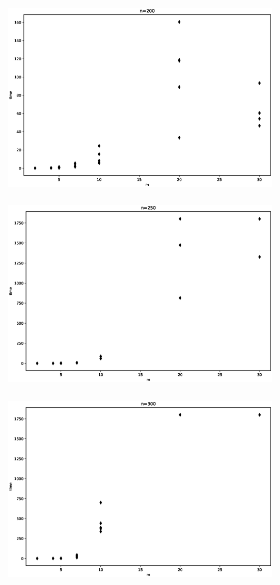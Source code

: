 \begin{figure}[h!]
\begin{subfigure}[b]{\textwidth}
\begin{subfigure}[b]{0.32\textwidth}
	         \includegraphics[width=\columnwidth]{images/bagm2.eps}
	     \end{subfigure}
	  \end{subfigure}
	  \begin{subfigure}[b]{\textwidth}
	  	\centering
	      \begin{subfigure}[b]{0.32\textwidth}
	         \includegraphics[width=\columnwidth]{images/bagm3.eps}
	     \end{subfigure}
	     \hspace{0em}
	      \begin{subfigure}[b]{0.32\textwidth}
	         \includegraphics[width=\columnwidth]{images/bagm4.eps}

\end{subfigure}
\end{subfigure}
\end{figure}
